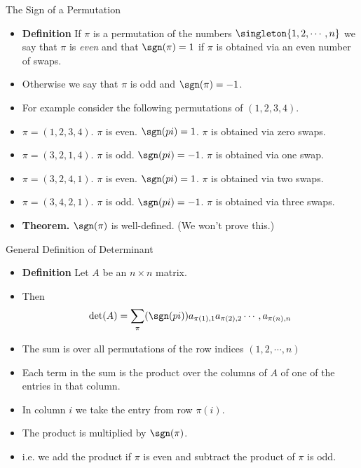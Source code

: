 \documentclass[handout]{beamer}
\begin{document}

\begin{frame}{The Sign of a Permutation}

\begin{itemize}
\item \textbf{Definition} If $\pi$ is a permutation of the numbers $\singleton{1,2,\cdots, n}$
we say that $\pi$ is \emph{even} and that $\sgn(\pi) = 1$ if $\pi$ is obtained via an even number of swaps.
\item Otherwise we say that $\pi$ is odd and $\sgn(\pi) = -1$.
\item For example consider the following permutations of $(1,2,3,4)$.
\item $\pi=(1,2,3,4)$. $\pi$ is even. $\sgn(pi) = 1$. $\pi$ is obtained via zero swaps.
\item $\pi=(3,2,1,4)$. $\pi$ is odd. $\sgn(pi) = -1$. $\pi$ is obtained via one swap.
\item $\pi=(3,2,4,1)$. $\pi$ is even. $\sgn(pi) = 1$. $\pi$ is obtained via two swaps.
\item $\pi=(3,4,2,1)$. $\pi$ is odd. $\sgn(pi) = -1$. $\pi$ is obtained via three swaps.
\item \textbf{Theorem.} $\sgn(\pi)$ is well-defined. (We won't prove this.)
\end{itemize}
\end{frame}


\begin{frame}{General Definition of Determinant}

\begin{itemize}
\item \textbf{Definition} Let $A$ be an $n\times n$ matrix.
\item Then
$$\det(A) = \sum_{\pi} (\sgn(pi)) a_{\pi(1),1} a_{\pi(2), 2} \cdots, a_{\pi(n), n}$$
\item The sum is over all permutations of the row indices $(1,2,\cdots, n)$
\item Each term in the sum is the product over the columns of $A$ of one of the entries in that column.
\item In column $i$ we take the entry from row $\pi(i)$.
\item The product is multiplied by $\sgn(\pi)$.
\item i.e. we add the product if $\pi$ is even and subtract the product of $\pi$ is odd.
\end{itemize}
\end{frame}
\end{document}
